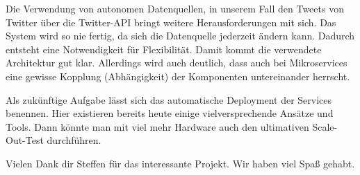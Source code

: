 Die Verwendung von autonomen Datenquellen, in unserem Fall den Tweets
von Twitter über die Twitter-API bringt weitere Herausforderungen mit
sich. Das System wird so nie fertig, da sich die Datenquelle jederzeit
ändern kann. Dadurch entsteht eine Notwendigkeit für Flexibilität.
Damit kommt die verwendete Architektur gut klar. Allerdings wird auch
deutlich, dass auch bei Mikroservices eine gewisse Kopplung
(Abhängigkeit) der Komponenten untereinander herrscht.

Als zukünftige Aufgabe lässt sich das automatische Deployment der
Services benennen. Hier existieren bereits heute einige
vielversprechende Ansätze und Tools. Dann könnte man mit viel mehr
Hardware auch den ultimativen Scale-Out-Test durchführen.

Vielen Dank dir Steffen für das interessante Projekt. Wir haben viel Spaß gehabt.